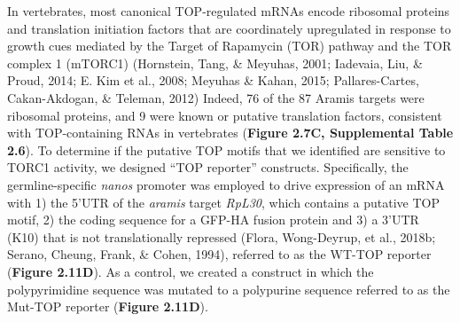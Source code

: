 \documentclass[12pt,oneside]{reedthesis}
\begin{document}
In vertebrates, most canonical TOP-regulated mRNAs encode ribosomal proteins and translation initiation factors that are coordinately upregulated in response to growth cues mediated by the Target of Rapamycin (TOR) pathway and the TOR complex 1 (mTORC1) (Hornstein, Tang, \& Meyuhas, 2001; Iadevaia, Liu, \& Proud, 2014; E. Kim et al., 2008; Meyuhas \& Kahan, 2015; Pallares-Cartes, Cakan-Akdogan, \& Teleman, 2012) Indeed, 76 of the 87 Aramis targets were ribosomal proteins, and 9 were known or putative translation factors, consistent with TOP-containing RNAs in vertebrates (\textbf{Figure 2.7C, Supplemental Table 2.6}). To determine if the putative TOP motifs that we identified are sensitive to TORC1 activity, we designed ``TOP reporter'' constructs. Specifically, the germline-specific \emph{nanos} promoter was employed to drive expression of an mRNA with 1) the 5'UTR of the \emph{aramis} target \emph{RpL30}, which contains a putative TOP motif, 2) the coding sequence for a GFP-HA fusion protein and 3) a 3'UTR (K10) that is not translationally repressed (Flora, Wong-Deyrup, et al., 2018b; Serano, Cheung, Frank, \& Cohen, 1994), referred to as the WT-TOP reporter (\textbf{Figure 2.11D}). As a control, we created a construct in which the polypyrimidine sequence was mutated to a polypurine sequence referred to as the Mut-TOP reporter (\textbf{Figure 2.11D}).
\end{document}
